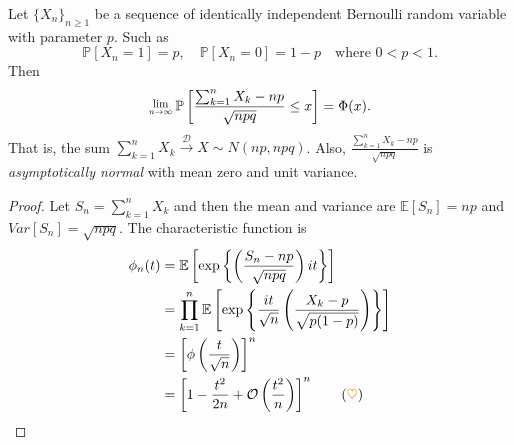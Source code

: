 \begin{theorem}
    Let $\{X_n\}_{n \geq 1}$ be a sequence of identically independent Bernoulli random variable with 
    parameter $p$. Such as 
    \[
        \mathbb{P}[X_n = 1] = p, \quad \mathbb{P}[X_n = 0] = 1-p \quad \text{where } 0<p<1.
    \]
    Then 
    \begin{equation}
        \Lim{n \to \infty} \mathbb{P} \left[\frac{\sum^n_{k=1} X_k - np}{\sqrt{npq}} \leq x \right] = \Phi(x).
    \end{equation}
    That is, the sum $\sum^n_{k=1} X_k \xrightarrow[]{\mathcal{D}} X \sim N(np, npq)$. Also, $\frac{\sum^n_{k=1} X_k - np}{\sqrt{npq}}$
    is \textit{asymptotically normal} with mean zero and unit variance.
\end{theorem}
\begin{proof}
    Let $S_n = \sum^n_{k=1} X_k$ and then the mean and variance are $\mathbb{E}[S_n] =np$ 
    and $Var[S_n] = \sqrt{npq}$. The characteristic function is 
    \begin{align*}
        \phi_n(t) &= \mathbb{E} \left[ \exp \left\{ \left( \frac{S_n - np}{\sqrt{npq}} \right)it \right\} \right]\\
        &= \prod_{k=1}^{n} \mathbb{E} \left[ \exp \left\{ \frac{it}{\sqrt{n}} \left( \frac{X_k - p}{\sqrt{p(1-p)}} \right)\right\} \right]\\
        &= \left[ \phi \left( \frac{t}{\sqrt{n}} \right) \right]^n\\
        &= \left[ 1 - \frac{t^2}{2n} + \mathcal{O} \left( \frac{t^2}{n} \right) \right]^n \label{eq:l1.0} \tag{{\color{orange} $\heartsuit $}}
    \end{align*}
\end{proof}

